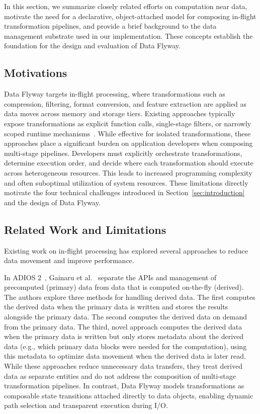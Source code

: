 In this section, we summarize closely related efforts on computation near data, motivate the need for a declarative, object-attached model for composing in-flight transformation pipelines, and provide a brief background to the data management substrate used in our implementation. These concepts establish the foundation for the design and evaluation of Data Flyway.

\subsection{Motivations}

Data Flyway targets in-flight processing, where transformations such as compression, filtering, format conversion, and feature extraction are applied as data moves across memory and storage tiers. Existing approaches typically expose transformations as explicit function calls, single-stage filters, or narrowly scoped runtime mechanisms~\cite{ravi2023runway}. While effective for isolated transformations, these approaches place a significant burden on application developers when composing multi-stage pipelines. Developers must explicitly orchestrate transformations, determine execution order, and decide where each transformation should execute across heterogeneous resources. This leads to increased programming complexity and often suboptimal utilization of system resources. These limitations directly motivate the four technical challenges introduced in Section~\ref{sec:introduction} and the design of Data Flyway.

\subsection{Related Work and Limitations}

Existing work on in-flight processing has explored several approaches to reduce data movement and improve performance.

In ADIOS 2~\cite{godoy2020adios2}, Gainaru et al.~\cite{gainaru2024toderive} separate the APIs and management of precomputed (primary) data from data that is computed on-the-fly (derived). The authors explore three methods for handling derived data. The first computes the derived data when the primary data is written and stores the results alongside the primary data. The second computes the derived data on demand from the primary data. The third, novel approach computes the derived data when the primary data is written but only stores metadata about the derived data (e.g., which primary data blocks were needed for the computation), using this metadata to optimize data movement when the derived data is later read. While these approaches reduce unnecessary data transfers, they treat derived data as separate entities and do not address the composition of multi-stage transformation pipelines. In contrast, Data Flyway models transformations as composable state transitions attached directly to data objects, enabling dynamic path selection and transparent execution during I/O.

